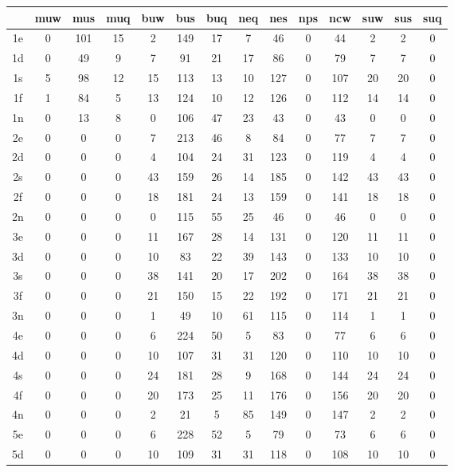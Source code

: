 \documentclass[a4paper,11pt]{article}
\begin{document}
	\begin{figure}
		\begin{tabular}{c|c|c|c|c|c|c|c|c|c|c|c|c|c}
			& muw & mus & muq & buw & bus & buq & neq & nes & nps & ncw & suw & sus & suq \\
			\hline
			1e & 0 & 101 & 15 & 2 & 149 & 17 & 7 & 46 & 0 & 44 & 2 & 2 & 0 \\
			1d & 0 & 49 & 9 & 7 & 91 & 21 & 17 & 86 & 0 & 79 & 7 & 7 & 0 \\ 
			1s & 5 & 98 & 12 & 15 & 113 & 13 & 10 & 127 & 0 & 107 & 20 & 20 & 0\\
			1f & 1 & 84 & 5 & 13 & 124 & 10 & 12 & 126 & 0 & 112 & 14 & 14 & 0 \\
			1n & 0 & 13 & 8 & 0 & 106 & 47 & 23 & 43& 0 & 43 & 0 & 0 & 0 \\
			2e & 0 & 0 & 0 & 7 & 213 & 46 & 8 & 84 & 0 & 77 & 7 & 7 & 0\\
			2d & 0 & 0 & 0 & 4 & 104 & 24 & 31 & 123 & 0 & 119 & 4 & 4 & 0 \\
			2s & 0 & 0 & 0 & 43 & 159 & 26 & 14 & 185 & 0 & 142 & 43 & 43 & 0\\
			2f & 0 & 0 & 0 & 18 & 181 & 24 & 13 & 159 & 0 & 141 & 18 & 18 & 0\\
			2n & 0 & 0 & 0 & 0 & 115 & 55 & 25 & 46 & 0 & 46 & 0 & 0 & 0 \\
			3e & 0 & 0 & 0 & 11 & 167 & 28 & 14 & 131 & 0 & 120 & 11 & 11 & 0\\
			3d & 0 & 0 & 0 & 10 & 83 & 22 & 39 & 143 & 0 & 133 & 10 & 10 & 0 \\
			3s & 0 & 0 & 0 & 38 & 141 & 20 & 17 & 202 & 0 & 164 & 38 & 38 & 0 \\
			3f & 0 & 0 & 0 & 21 & 150 & 15 & 22 & 192 & 0 & 171 & 21 & 21 & 0 \\
			3n & 0 & 0 & 0 & 1 & 49 & 10 & 61 & 115 & 0 & 114 & 1 & 1 & 0 \\
			4e & 0 & 0 & 0 & 6 & 224 & 50 & 5 & 83 & 0 & 77 & 6 & 6 & 0 \\
			4d & 0 & 0 & 0 & 10 & 107 & 31 & 31 & 120 & 0 & 110 & 10 & 10 & 0 \\
			4s & 0 & 0 & 0 & 24 & 181 & 28 & 9 & 168 & 0 & 144 & 24 & 24 & 0\\
			4f & 0 & 0 & 0 & 20 & 173 & 25 & 11 & 176 & 0 & 156 & 20 & 20 & 0 \\
			4n & 0 & 0 & 0 & 2 & 21 & 5 & 85 & 149 & 0 & 147 & 2 & 2 & 0 \\
			5e & 0 & 0 & 0 & 6 & 228 & 52 & 5 & 79 & 0 & 73 & 6 & 6 & 0 \\
			5d & 0 & 0 & 0 & 10 & 109 & 31 & 31 & 118 & 0 & 108 & 10 & 10 & 0 \\

\end{tabular}
\end{figure}
\end{document}
